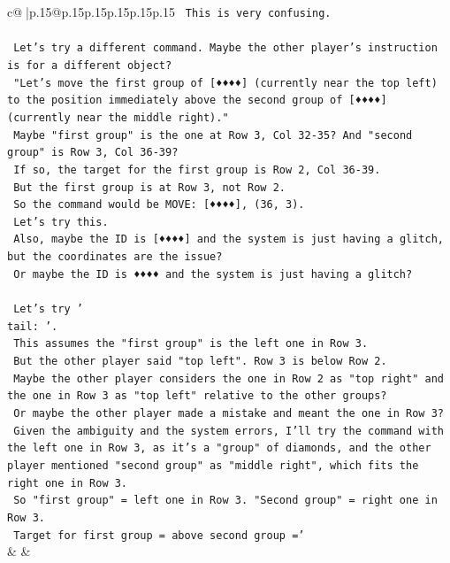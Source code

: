 \documentclass{article}
\begin{document}
{\begin{supertabular}{c@{$\;$}|p{.15\linewidth}@{}p{.15\linewidth}p{.15\linewidth}p{.15\linewidth}p{.15\linewidth}p{.15\linewidth}}
{{{\texttt{    This is very confusing.} \\
\\ 
\texttt{    Let's try a different command. Maybe the other player's instruction is for a different object?} \\
\texttt{    "Let's move the first group of {[}♦♦♦♦{]} (currently near the top left) to the position immediately above the second group of {[}♦♦♦♦{]} (currently near the middle right)."} \\
\texttt{    Maybe "first group" is the one at Row 3, Col 32{-}35? And "second group" is Row 3, Col 36{-}39?} \\
\texttt{    If so, the target for the first group is Row 2, Col 36{-}39.} \\
\texttt{    But the first group is at Row 3, not Row 2.} \\
\texttt{    So the command would be MOVE: {[}♦♦♦♦{]}, (36, 3).} \\
\texttt{    Let's try this.} \\
\texttt{    Also, maybe the ID is {[}♦♦♦♦{]} and the system is just having a glitch, but the coordinates are the issue?} \\
\texttt{    Or maybe the ID is ♦♦♦♦ and the system is just having a glitch?} \\
\\ 
\texttt{    Let's try '} \\
\texttt{tail: '.} \\
\texttt{    This assumes the "first group" is the left one in Row 3.} \\
\texttt{    But the other player said "top left". Row 3 is below Row 2.} \\
\texttt{    Maybe the other player considers the one in Row 2 as "top right" and the one in Row 3 as "top left" relative to the other groups?} \\
\texttt{    Or maybe the other player made a mistake and meant the one in Row 3?} \\
\texttt{    Given the ambiguity and the system errors, I'll try the command with the left one in Row 3, as it's a "group" of diamonds, and the other player mentioned "second group" as "middle right", which fits the right one in Row 3.} \\
\texttt{    So "first group" = left one in Row 3. "Second group" = right one in Row 3.} \\
\texttt{    Target for first group = above second group ='} \\
            }
        }
    }
    & & \\ \\


\end{supertabular}}
\end{document}
